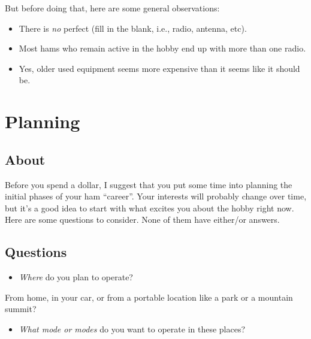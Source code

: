 \documentclass[
  letterpaper,
  DIV=11,
  numbers=noendperiod]{scrreport}
\providecommand{\tightlist}{%
  \setlength{\itemsep}{0pt}\setlength{\parskip}{0pt}}\usepackage{longtable,booktabs,array}
\begin{document}
But before doing that, here are some general observations:

\begin{itemize}
\tightlist
\item
  There is \emph{no} perfect (fill in the blank, i.e., radio, antenna,
  etc).
\item
  Most hams who remain active in the hobby end up with more than one
  radio.
\item
  Yes, older used equipment seems more expensive than it seems like it
  should be.
\end{itemize}

\hypertarget{planning}{%
\chapter*{Planning}\label{planning}}


\hypertarget{about-6}{%
\section*{About}\label{about-6}}


Before you spend a dollar, I suggest that you put some time into
planning the initial phases of your ham ``career''. Your interests will
probably change over time, but it's a good idea to start with what
excites you about the hobby right now. Here are some questions to
consider. None of them have either/or answers.

\hypertarget{questions}{%
\section*{Questions}\label{questions}}


\begin{itemize}
\tightlist
\item
  \emph{Where} do you plan to operate?
\end{itemize}

From home, in your car, or from a portable location like a park or a
mountain summit?

\begin{itemize}
\tightlist
\item
  \emph{What mode or modes} do you want to operate in these places?
\end{itemize}
\end{document}
